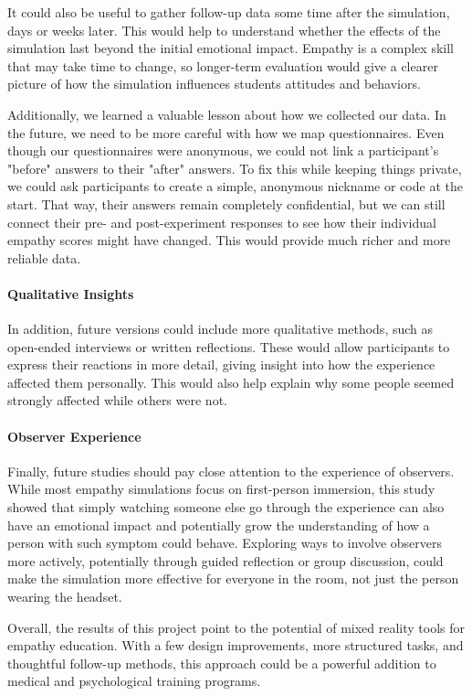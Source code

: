It could also be useful to gather follow-up data some time after the simulation, days or weeks later. This would help to understand whether the effects of the simulation last beyond the initial emotional impact. Empathy is a complex skill that may take time to change, so longer-term evaluation would give a clearer picture of how the simulation influences students attitudes and behaviors.

Additionally, we learned a valuable lesson about how we collected our data. In the future, we need to be more careful with how we map questionnaires. Even though our questionnaires were anonymous, we could not link a participant's "before" answers to their "after" answers. To fix this while keeping things private, we could ask participants to create a simple, anonymous nickname or code at the start. That way, their answers remain completely confidential, but we can still connect their pre- and post-experiment responses to see how their individual empathy scores might have changed. This would provide much richer and more reliable data.

\vspace{1em}

\paragraph{Qualitative Insights} In addition, future versions could include more qualitative methods, such as open-ended interviews or written reflections. These would allow participants to express their reactions in more detail, giving insight into how the experience affected them personally. This would also help explain why some people seemed strongly affected while others were not.

\paragraph{Observer Experience} Finally, future studies should pay close attention to the experience of observers. While most empathy simulations focus on first-person immersion, this study showed that simply watching someone else go through the experience can also have an emotional impact and potentially grow the understanding of how a person with such symptom could behave. Exploring ways to involve observers more actively, potentially through guided reflection or group discussion, could make the simulation more effective for everyone in the room, not just the person wearing the headset.

\vspace{1em}

Overall, the results of this project point to the potential of mixed reality tools for empathy education. With a few design improvements, more structured tasks, and thoughtful follow-up methods, this approach could be a powerful addition to medical and psychological training programs.